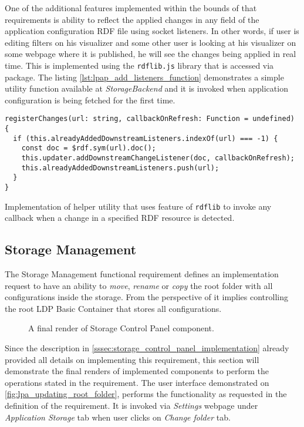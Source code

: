 One of the additional features implemented within the bounds of that requirements is ability to reflect the applied changes in any field of the application configuration RDF file using socket listeners. In other words, if user is editing filters on his visualizer and some other user is looking at his visualizer on some webpage where it is published, he will see the changes being applied in real time. This is implemented using the \texttt{rdflib.js} library that is accessed via \lpas{} package. The listing \autoref{lst:lpap_add_listeners_function} demonstrates a simple utility function available at \textit{StorageBackend} and it is invoked when application configuration is being fetched for the first time. 


\begin{listing}[H]    
\begin{verbatim}
registerChanges(url: string, callbackOnRefresh: Function = undefined) {
  if (this.alreadyAddedDownstreamListeners.indexOf(url) === -1) {
    const doc = $rdf.sym(url).doc();
    this.updater.addDownstreamChangeListener(doc, callbackOnRefresh);
    this.alreadyAddedDownstreamListeners.push(url);
  }
}
\end{verbatim}
\caption{Implementation of helper utility that uses feature of \texttt{rdflib} to invoke any callback when a change in a specified RDF resource is detected.} 
\label{lst:lpap_add_listeners_function}
\end{listing}

\subsection{Storage Management}

The Storage Management functional requirement defines an implementation request to have an ability to \textit{move}, \textit{rename} or \textit{copy} the root folder with all configurations inside the storage. From the perspective of \lpas{} it implies controlling the root LDP Basic Container that stores all configurations.

\begin{figure}[h]
\centering
{}
\caption{A final render of Storage Control Panel component.}
\label{fig:lpa_updating_root_folder}
\end{figure}

Since the description in \autoref{sssec:storage_control_panel_implementation} already provided all details on implementing this requirement, this section will demonstrate the final renders of implemented components to perform the operations stated in the requirement. The user interface demonstrated on \autoref{fig:lpa_updating_root_folder}, performs the functionality as requested in the definition of the requirement. It is invoked via \textit{Settings} webpage under \textit{Application Storage} tab when user clicks on \textit{Change folder} tab. 

